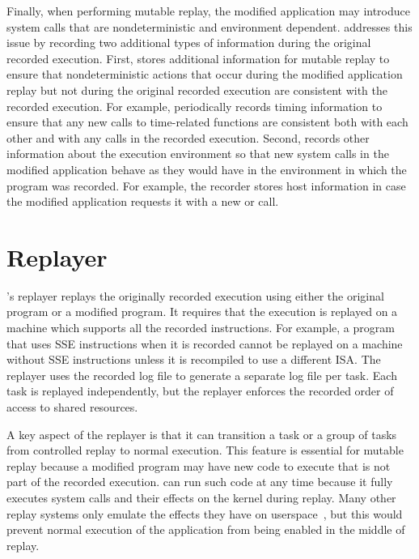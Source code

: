 Finally, when performing mutable replay, the modified application
may introduce system calls that are nondeterministic and environment
dependent.  {\dora} addresses this issue by recording two
additional types of information during the original recorded
execution.  First, {\dora} stores additional
information for mutable replay to ensure that nondeterministic actions
that occur during the modified application replay but not during the
original recorded execution are consistent with the recorded
execution.  For example, {\dora} periodically
records timing information to ensure that any new calls to time-related
functions are consistent both with each other and with any calls in the recorded execution.
Second, {\dora} records other information about the execution environment so
that new system calls in the modified application behave as they would have in
the environment in which the program was recorded.
For example, the recorder stores
host information in case the modified application requests it with a new
 or  call.

\section{Replayer}
\label{dora:sec:replayer}

{\dora}'s replayer replays the originally
recorded execution using either the original program or a modified
program. It requires that the execution is replayed on a machine which
supports all the recorded instructions. For example, a program that
uses SSE instructions when it is recorded cannot be replayed on a
machine without SSE instructions unless it is recompiled to use a different
ISA.  The replayer uses the recorded log file to generate a separate
log file per task.  Each task is replayed independently, but the
replayer enforces the recorded order of access to shared resources.  

A key aspect of the replayer is that it can
transition a task or a group of tasks from controlled replay to normal
execution. This feature is essential for mutable replay because a
modified program may have new code to execute that is not
part of the recorded execution.
{\dora} can run such code at any time because it
fully executes system calls and their effects on the kernel during
replay. Many other replay systems only emulate the effects they have
on userspace~\cite{jockey,r2:osdi}, but this would prevent normal
execution of the application from being enabled in the middle of
replay.

